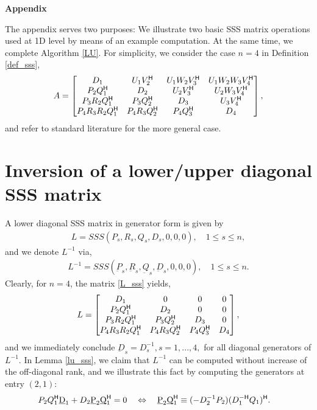 \begin{normalsize}
\noindent\textbf{Appendix} \\
\end{normalsize}

\noindent The appendix serves two purposes: We illustrate two basic SSS matrix operations used at 1D level by means of an example computation. At the same time, we complete Algorithm \ref{LU}. For simplicity, we consider the case $n=4$ in Definition \ref{def_sss},
\begin{equation*}%
        A=\begin{bmatrix}
                      D_1 & U_1V_2^\trp & U_1W_2V_3^\trp & U_1W_2W_3V_4^\trp \\
                      P_2Q_1^\trp & D_2 & U_2V_3^\trp & U_2W_3V_4^\trp  \\
                      P_3R_2Q_1^\trp & P_3Q_2^\trp & D_3 & U_3V_4^\trp  \\
                      P_4R_3R_2Q_1^\trp & P_4R_3Q_2^\trp & P_4Q_3^\trp & D_4
                    \end{bmatrix},
\end{equation*}
and refer to standard literature for the more general case.
\section{Inversion of a lower/upper diagonal SSS matrix}
\label{app_invsss}
A lower diagonal SSS matrix in generator form is given by 
\begin{align}
\label{L_sss}
 L = SSS(P_s, R_s, Q_s, D_s, 0, 0, 0), \quad 1 \leq s \leq n,
\end{align}
and we denote $L^{-1}$ via,
\begin{align*}
 L^{-1} = SSS(\underbar{P}_s, \underbar{R}_s, \underbar{Q}_s, \underbar{D}_s, 0, 0, 0), \quad 1 \leq s \leq n.
\end{align*}
Clearly, for $n=4$, the matrix \eqref{L_sss} yields,
\begin{equation*}%
        L=\begin{bmatrix}
                      D_1 & 0 & 0 & 0 \\
                      P_2Q_1^\trp & D_2 & 0 & 0  \\
                      P_3R_2Q_1^\trp & P_3Q_2^\trp & D_3 & 0  \\
                      P_4R_3R_2Q_1^\trp & P_4R_3Q_2^\trp & P_4Q_3^\trp & D_4
                    \end{bmatrix},
\end{equation*}
and we immediately conclude $\underbar{D}_s = D_s^{-1}, s=1,...,4,$ for all diagonal generators of $L^{-1}$.
In Lemma \ref{lu_sss}, we claim that $L^{-1}$ can be computed without increase of the off-diagonal rank, and we illustrate this fact by computing the generators at entry $(2,1)$:
\begin{align*}
 & P_2 Q_1^{\mathsf{H}} \underbar{D}_1 + D_2 \underbar{P}_2 \underbar{Q}_1^{\mathsf{H}} = 0 \quad \Leftrightarrow \quad \underbar{P}_2 \underbar{Q}_1^{\mathsf{H}} \equiv (-D_2^{-1} P_2) (D_1^{-\mathsf{H}} Q_1)^{\mathsf{H}}.
\end{align*}


